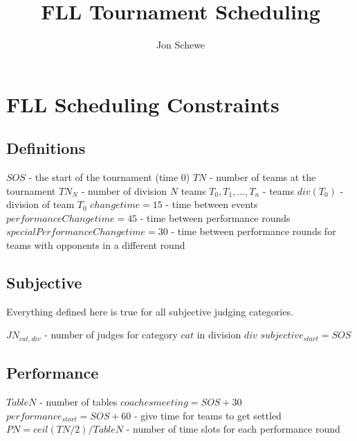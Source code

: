 \documentclass[letterpaper,11pt]{report}
\title{FLL Tournament Scheduling}
\author{Jon Schewe}
\begin{document}
\maketitle

\chapter{FLL Scheduling Constraints}

\section{Definitions}

\begin{algorithmic}
\STATE $SOS$ - the start of the tournament (time 0)
\STATE $TN$ - number of teams at the tournament
\STATE $TN_{N}$ - number of division $N$ teams
\STATE $T_{0}, T_{1}, \dots, T_{n}$ - teams
\STATE $div(T_{0})$ - division of team $T_{0}$
\STATE $changetime = 15$ - time between events
\STATE $performanceChangetime = 45$ - time between performance rounds
\STATE $specialPerformanceChangetime = 30$ - time between performance
rounds for teams with opponents in a different round
\end{algorithmic}

\FloatBarrier
\section{Subjective}

Everything defined here is true for all subjective judging categories.

\begin{algorithmic}
\STATE $JN_{cat,div}$ - number of judges for category $cat$ in division $div$
\STATE $subjective_{start} = SOS$
\end{algorithmic}

\FloatBarrier
\section{Performance}
\begin{algorithmic}
\STATE $TableN$ - number of tables
\STATE $coaches meeting = SOS + 30$
\STATE $performance_{start} = SOS + 60$ - give time for teams to get settled
\STATE $PN = ceil(TN / 2) / TableN$ - number of time slots for each performance round
\end{algorithmic}
\end{document}
